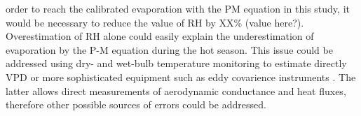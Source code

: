 \documentclass[a4paper,12pt]{article}
\begin{document}
\begin{linenumbers}
order to reach the calibrated evaporation with the PM equation in this study, it would be necessary to reduce the value of RH by XX\% (value here?). Overestimation of RH alone could easily explain the underestimation of evaporation by the P-M equation during the hot season. This issue could be addressed using dry- and wet-bulb temperature monitoring to estimate directly VPD \citep{Holwerdaetal2006, Holwerdaetal2010} or more sophisticated equipment such as eddy covarience instruments \citep{Holwerdaetal2012}. The latter allows direct measurements of aerodynamic conductance and heat fluxes, therefore other possible sources of errors could be addressed.



\end{linenumbers}
\end{document}

